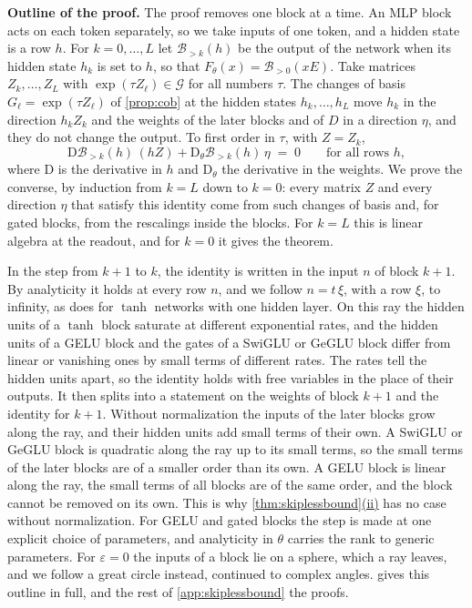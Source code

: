 \documentclass[10pt]{article}
\theoremstyle{definition}
\theoremstyle{remark}
\newcommand{\Der}{\mathrm{D}}
\newcommand{\G}{\mathcal{G}}
\newcommand{\para}[1]{\smallskip\noindent\textbf{#1}\hspace{0.5em}}
\DeclareRobustCommand{\cpref}[2]{\hyperref[#1:#2]{\cref*{#1}(#2)}}
\begin{document}
\para{Outline of the proof.} The proof removes one block at a time. An MLP block acts on each token separately, so we take inputs of one token, and a hidden state is a row $h$. For $k = 0, \dots, L$ let $\mathcal B_{>k}(h)$ be the output of the network when its hidden state $h_k$ is set to $h$, so that $F_\theta(x) = \mathcal B_{>0}(xE)$. Take matrices $Z_k, \dots, Z_L$ with $\exp(\tau Z_\ell) \in \G$ for all numbers $\tau$. The changes of basis $G_\ell = \exp(\tau Z_\ell)$ of \cref{prop:cob} at the hidden states $h_k, \dots, h_L$ move $h_k$ in the direction $h_kZ_k$ and the weights of the later blocks and of $D$ in a direction $\eta$, and they do not change the output. To first order in $\tau$, with $Z = Z_k$,
\[
\Der\mathcal B_{>k}(h)\,(hZ) + \Der_\theta\mathcal B_{>k}(h)\,\eta \;=\; 0 \qquad\text{for all rows } h ,
\]
where $\Der$ is the derivative in $h$ and $\Der_\theta$ the derivative in the weights. We prove the converse, by induction from $k = L$ down to $k = 0$: every matrix $Z$ and every direction $\eta$ that satisfy this identity come from such changes of basis and, for gated blocks, from the rescalings inside the blocks. For $k = L$ this is linear algebra at the readout, and for $k = 0$ it gives the theorem.

In the step from $k+1$ to $k$, the identity is written in the input $n$ of block $k+1$. By analyticity it holds at every row $n$, and we follow $n = t\,\xi$, with a row $\xi$, to infinity, as \citet{sussmann1992} does for $\tanh$ networks with one hidden layer. On this ray the hidden units of a $\tanh$ block saturate at different exponential rates, and the hidden units of a GELU block and the gates of a SwiGLU or GeGLU block differ from linear or vanishing ones by small terms of different rates. The rates tell the hidden units apart, so the identity holds with free variables in the place of their outputs. It then splits into a statement on the weights of block $k+1$ and the identity for $k+1$. Without normalization the inputs of the later blocks grow along the ray, and their hidden units add small terms of their own. A SwiGLU or GeGLU block is quadratic along the ray up to its small terms, so the small terms of the later blocks are of a smaller order than its own. A GELU block is linear along the ray, the small terms of all blocks are of the same order, and the block cannot be removed on its own. This is why \cpref{thm:skiplessbound}{ii} has no case without normalization. For GELU and gated blocks the step is made at one explicit choice of parameters, and analyticity in $\theta$ carries the rank to generic parameters. For $\varepsilon = 0$ the inputs of a block lie on a sphere, which a ray leaves, and we follow a great circle instead, continued to complex angles.  gives this outline in full, and the rest of \cref{app:skiplessbound} the proofs.
\end{document}

